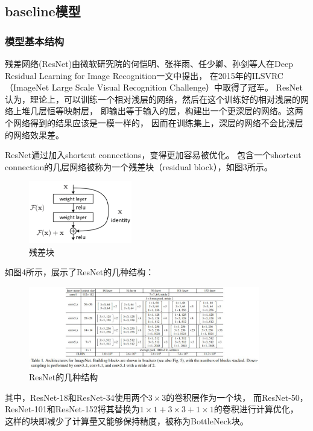 \documentclass[UTF8]{ctexart}
\begin{document}
\subsection{baseline模型}

\subsubsection{模型基本结构}
残差网络(ResNet)由微软研究院的何恺明、张祥雨、任少卿、孙剑等人在Deep Residual Learning for Image Recognition一文中提出，
在2015年的ILSVRC（ImageNet Large Scale Visual Recognition Challenge）中取得了冠军。
ResNet认为，理论上，可以训练一个相对浅层的网络，然后在这个训练好的相对浅层的网络上堆几层恒等映射层，
即输出等于输入的层，构建出一个更深层的网络。这两个网络得到的结果应该是一模一样的，
因而在训练集上，深层的网络不会比浅层的网络效果差。


ResNet通过加入shortcut connections，变得更加容易被优化。
包含一个shortcut connection的几层网络被称为一个残差块（residual block），如图3所示。


\begin{figure}[htbp]
    \centering
    \includegraphics[width=0.40\textwidth]{../img/1-1.png}
    \caption{残差块}
\end{figure}

如图4所示，展示了ResNet的几种结构：

\begin{figure}[htbp]
    \centering
    \includegraphics[width=0.90\textwidth]{../img/1-2.jpg}
    \caption{ResNet的几种结构}
\end{figure}

其中，ResNet-18和ResNet-34使用两个$3\times3$的卷积层作为一个块，
而ResNet-50，ResNet-101和ResNet-152将其替换为$1\times1+3\times3+1\times1$的卷积进行计算优化，
这样的块即减少了计算量又能够保持精度，被称为BottleNeck块。
\end{document}
